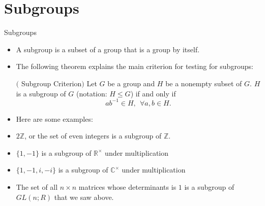 \documentclass[ %
 10pt, xcolor={dvipsnames,svgnames,x11names,hyperref},
   hyperref={colorlinks=true,citecolor=green,linkcolor=DarkRed,urlcolor=ProcessBlue,anchorcolor=blue}
  ]{beamer}
\newenvironment{stepitemize}{\begin{itemize}[<+->]}{\end{itemize} }
\newcommand{\Z}{\mathbb{Z}}
\newcommand{\R}{\mathbb{R}}
\newcommand{\C}{\mathbb{C}}
\begin{document}
\section{Subgroups}
\begin{frame}{Subgroups}
    \begin{stepitemize}
    \item A subgroup is a subset of a group that is a group by itself.
    \item The following theorem explains the main criterion for testing for subgroups:
    \begin{theorem}$($ Subgroup Criterion$)$
Let $G$ be a group and $H$ be a nonempty subset of $G$. $H$ is a subgroup of $G$ (notation: $H\leq G$) if and only if 
$$ab^{-1} \in H, \:\: \forall a,b\in H. $$
\end{theorem}

\end{stepitemize}
\end{frame}

\begin{frame}
\begin{stepitemize}
\item Here are some examples:

    \item $2\Z$, or the set of even integers is a subgroup of $\Z$.
    \item $\{1,-1\}$ is a subgroup of $\R^{\times}$ under multiplication 
    \item $\{1,-1, i, -i\}$ is a subgroup of $\C^{\times}$ under multiplication 
    \item The set of all $n\times n$ matrices whose determinants is $1$ is a subgroup of $GL(n;R)$ that we saw above.
    \end{stepitemize}
\end{frame}
\end{document}
